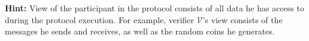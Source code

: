 \documentclass[../lecture-notes-148x210.tex]{subfiles}
\begin{document}
\textbf{Hint:} View of the participant in the protocol consists of all data he
has access to during the protocol execution. For example, verifier
$\mathcal{V}$'s view consists of the messages he sends and receives, as well as
the random coins he generates.

\end{document}
